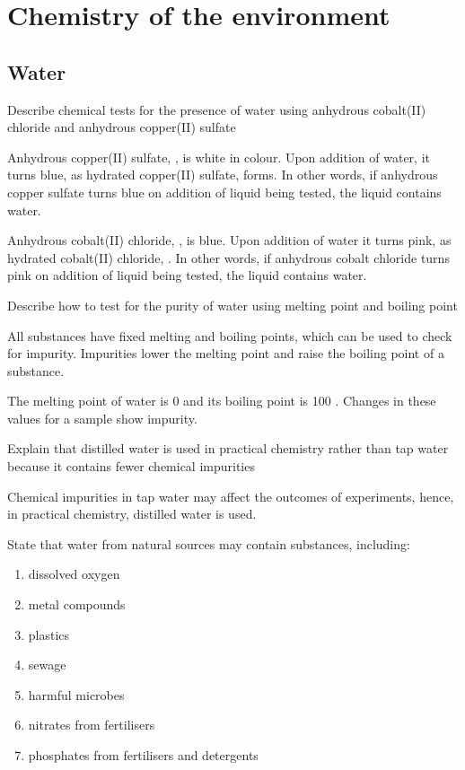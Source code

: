 \section{Chemistry of the environment}
\subsection{Water}

\begin{point}
Describe chemical tests for the presence of water using anhydrous cobalt(II) chloride and anhydrous 
copper(II) sulfate
\end{point}

Anhydrous copper(II) sulfate, , is white in colour. Upon addition of water, it
turns blue, as hydrated copper(II) sulfate,  forms. In other words,
if anhydrous copper sulfate turns blue on addition of liquid being tested, the liquid contains
water.

Anhydrous cobalt(II) chloride, , is blue. Upon addition of water it turns pink,
as hydrated cobalt(II) chloride, . In other words, if anhydrous cobalt
chloride turns pink on addition of liquid being tested, the liquid contains water.

\begin{point}
Describe how to test for the purity of water using melting point and boiling point
\end{point}

All substances have fixed melting and boiling points, which can be used to check for impurity. 
Impurities lower the melting point and raise the boiling point of a substance.

The melting point of water is 0 \celsius and its boiling point is 100 \celsius. Changes in these
values for a sample show impurity.

\begin{point}
Explain that distilled water is used in practical chemistry rather than tap water because it contains fewer 
chemical impurities
\end{point}

Chemical impurities in tap water may affect the outcomes of experiments, hence, in practical 
chemistry, distilled water is used.

\begin{point}
State that water from natural sources may contain substances, including:
\begin{enumerate}[label=(\alph*)]
	\setlength\itemsep{0em}
	\item dissolved oxygen
	\item metal compounds
	\item plastics
	\item sewage
	\item harmful microbes
	\item nitrates from fertilisers
	\item phosphates from fertilisers and detergents
\end{enumerate}
\end{point}

